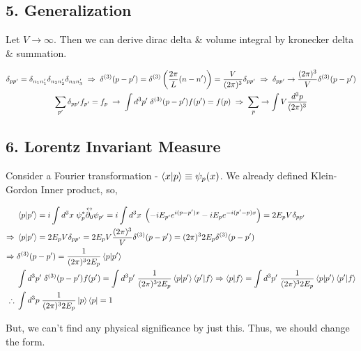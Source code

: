 \documentclass[11pt,letterpaper]{article}
\begin{document}
\subsection*{5. Generalization}

Let $V\rightarrow\infty$. Then we can derive dirac delta \& volume integral by kronecker delta \& summation.

\begin{gather}
	\delta_{pp'} = \delta_{n_1n_1'}\delta_{n_2n_2'}\delta_{n_3n_3'} \hspace{0.1cm} \Rightarrow \hspace{0.1cm} \delta^{(3)}(p-p') = \delta^{(3)}\left( \frac{2\pi}{L}(n-n') \right)=\dfrac{V}{(2\pi)^3}\delta_{pp'}\hspace{0.1cm} \Rightarrow \hspace{0.1cm} \delta_{pp'}\rightarrow\dfrac{(2\pi)^3}{V}\delta^{(3)}(p-p')\nonumber\\
    \sum_{p'} \delta_{pp'}f_{p'} = f_p \hspace{0.1cm} \rightarrow \hspace{0.1cm} \int d^3p'\hspace{0.1cm} \delta^{(3)}(p-p')f(p')=f(p)\hspace{0.1cm} \Rightarrow\hspace{0.1cm} \sum_p \rightarrow \int V \dfrac{d^3p}{(2\pi)^3}
\end{gather}

\subsection*{6. Lorentz Invariant Measure}

Consider a Fourier transformation - $\braket{x|p} \equiv \psi_p(x)$. We already defined Klein-Gordon Inner product, so, 

\begin{equation}
\begin{split}
    &\braket{p|p'} = i \int d^3x \hspace{0.1cm} \psi_p^* \overset{\leftrightarrow}{\partial_0} \psi_{p'} = i \int d^3x\hspace{0.1cm}\left( -iE_{p'}e^{i(p-p')x}-iE_pe^{-i(p'-p)x} \right) = 2E_p V\delta_{pp' }\\
    \Rightarrow \hspace{0.1cm} &\braket{p|p'} =2E_pV\delta_{pp'}=2E_pV\frac{(2\pi)^3}{V}\delta^{(3)}(p-p') = (2\pi)^32E_p \delta^{(3)}(p-p') \\
    \Rightarrow \hspace{0.1cm} &\delta^{(3)}(p-p') = \frac{1}{(2\pi)^32E_p}\braket{p|p'} \\
    &\int d^3p'\hspace{0.1cm} \delta^{(3)}(p-p')f(p') = \int d^3p' \hspace{0.1cm} \frac{1}{(2\pi)^3 2E_p} \braket{p|p'} \braket{p'|f} \Rightarrow \braket{p|f} = \int d^3p' \hspace{0.1cm} \frac{1}{(2\pi)^32E_p}\braket{p|p'}\braket{p'|f} \\
    \therefore \hspace{0.1cm} &\int d^3p \hspace{0.1cm} \frac{1}{(2\pi)^32E_p}\ket{p}\bra{p} = 1
\end{split}
\end{equation}

But, we can't find any physical significance by just this. Thus, we should change the form.
\end{document}
